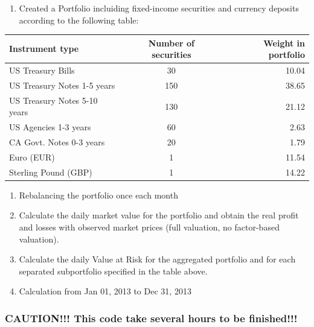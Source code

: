 \documentclass[letterpaper,10pt,english]{/anaconda/lib/python2.7/site-packages/sphinx/texinputs/sphinxhowto}
\begin{document}
\begin{enumerate}
\def\labelenumi{\arabic{enumi}.}
\itemsep1pt\parskip0pt
\item
  Created a Portfolio incluiding fixed-income securities and currency
  deposits according to the following table:
\end{enumerate}

\begin{center}
\begin{tabular} {|l|c|r|}
\hline
\textbf{Instrument type} & \textbf{Number of securities} & \textbf{Weight in portfolio} \\
\hline
US Treasury Bills & 30 & 10.04 \\
US Treasury Notes 1-5 years & 150 & 38.65 \\
US Treasury Notes 5-10 years & 130 & 21.12 \\
US Agencies 1-3 years & 60 & 2.63 \\
CA Govt. Notes 0-3 years & 20 & 1.79 \\
Euro (EUR) & 1 & 11.54 \\
Sterling Pound (GBP) & 1 & 14.22\\
\hline
\end{tabular}
\end{center}

\begin{enumerate}
\def\labelenumi{\arabic{enumi}.}
\setcounter{enumi}{1}
\item
  Rebalancing the portfolio once each month
\item
  Calculate the daily market value for the portfolio and obtain the real
  profit and losses with observed market prices (full valuation, no
  factor-based valuation).
\item
  Calculate the daily Value at Risk for the aggregated portfolio and for
  each separated subportfolio specified in the table above.
\item
  Calculation from Jan 01, 2013 to Dec 31, 2013
\end{enumerate}\subsubsection{CAUTION!!! This code take several hours to be finished!!!}

\end{document}

